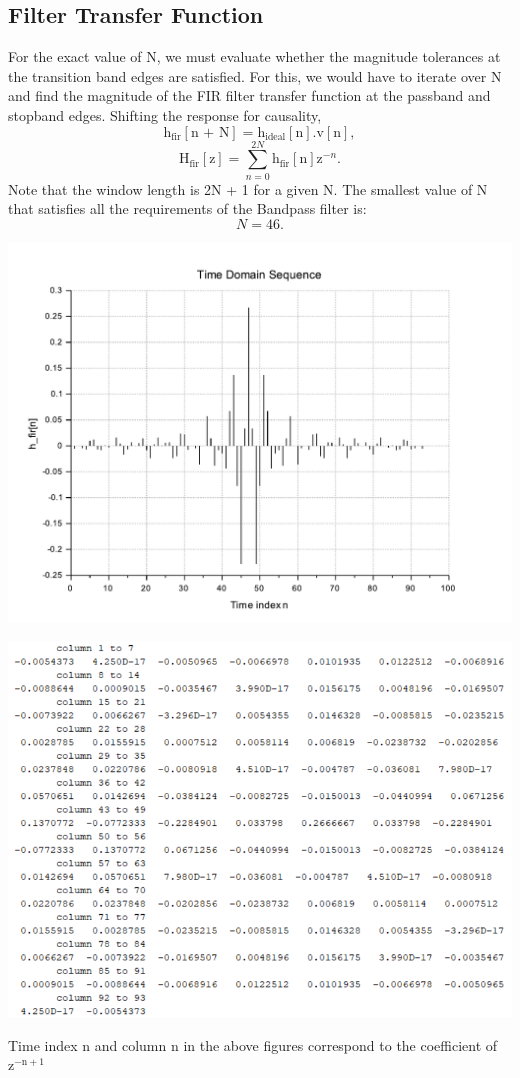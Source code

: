 \documentclass[12pt]{article}
\begin{document}
\subsection{Filter Transfer Function}
For the exact value of N, we must evaluate whether the magnitude tolerances at the transition band edges are satisfied. For this, we would have to iterate over N and find the magnitude of the FIR filter transfer function at the passband and stopband edges. Shifting the response for causality,
\[\text{h}_\text{fir}[\text{n + N}] = \text{h}_\text{ideal}[\text{n}].\text{v}[\text{n}],\]
\[\text{H}_\text{fir}[\text{z}] = \sum_{n = 0}^{2N}\text{h}_\text{fir}[\text{n}]\text{z}^{-n}.\]
Note that the window length is 2N + 1 for a given N. The smallest value of N that satisfies all the requirements of the Bandpass filter is:\[N = 46.\]
\begin{center}
    \includegraphics[width=\textwidth]{time_bp.pdf}
\end{center}
\begin{center}
    \includegraphics[width=\textwidth]{h_fir_bp.png}
\end{center}
Time index n and column n in the above figures correspond to the coefficient of $\text{z}^{-\text{n}+1}$
\newpage
\end{document}
